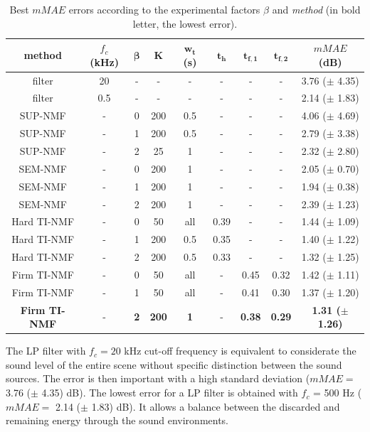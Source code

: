 \documentclass[review,5p,twocolumn,sort&compress,times]{elsarticle}
\begin{document}
\begin{table}[t]
\centering
\caption{Best $mMAE$ errors according to the experimental factors $\beta$ and \textit{method} (in bold letter, the lowest error).}
\begin{tabular}{@{}ccccccccc@{}}
\toprule
\textbf{method} & $f_c$ (kHz) & $\mathbf{\beta}$ & $\mathbf{K}$ & $\mathbf{w_t}$ (s) &  $\mathbf{t_h}$ &  $\mathbf{t_{f,1}}$ &  $\mathbf{t_{f,2}}$ & \textbf{$mMAE$} (dB) \\ \midrule
filter & 20 & - & - & - & - & - & - & 3.76 ($\pm$ 4.35) \\
filter & 0.5 & - & - & - & - & - & - & 2.14 ($\pm$ 1.83) \\ 
\hline \hline
SUP-NMF & - & 0 & 200 & 0.5 & - & - & - & 4.06 ($\pm$ 4.69) \\
SUP-NMF & - & 1 & 200 & 0.5 & - & - & - & 2.79 ($\pm$ 3.38) \\
SUP-NMF & - & 2 & 25 & 1 & - & - & - & 2.32  ($\pm$ 2.80) \\ 
\hline \hline
SEM-NMF & - & 0 & 200 & 1 & - & - & - & 2.05 ($\pm$ 0.70) \\
SEM-NMF & - & 1 & 200 & 1 & - & - & - & 1.94 ($\pm$ 0.38) \\
SEM-NMF & - & 2 & 200 & 1 & - & - & - & 2.39 ($\pm$ 1.23) \\ 
\hline \hline
Hard TI-NMF & - & 0 & 50 & all & 0.39 & - & - & 1.44 ($\pm$ 1.09)\\
Hard TI-NMF & - & 1 & 200 & 0.5 & 0.35 & - & - & 1.40 ($\pm$ 1.22)\\
Hard TI-NMF & - & 2 & 200 & 0.5 & 0.33 & - & - & 1.32 ($\pm$ 1.25)\\
\hline \hline
Firm TI-NMF & - & 0 & 50 & all & - & 0.45 & 0.32 & 1.42 ($\pm$ 1.11)\\
Firm TI-NMF & - & 1 & 50 & all & - & 0.41 & 0.30 & 1.37 ($\pm$ 1.20) \\
\textbf{Firm TI-NMF} & - & \textbf{2} & \textbf{200} & \textbf{1} & - & \textbf{0.38} & \textbf{0.29} & \textbf{1.31 ($\pm$ 1.26)}\\ 
\bottomrule
\end{tabular}
\label{tab:results}
\end{table}


The LP filter with $f_c = 20$ kHz cut-off frequency is equivalent to considerate the sound level of the entire scene without specific distinction between the sound sources. The error is then important with a high standard deviation ($mMAE =$ 3.76 ($\pm$ 4.35) dB). The lowest error for a LP filter is obtained with $f_c$ = 500 Hz ($mMAE =$ 2.14 ($\pm$ 1.83) dB). It allows a balance between the discarded and remaining energy through the sound environments.
\end{document}
